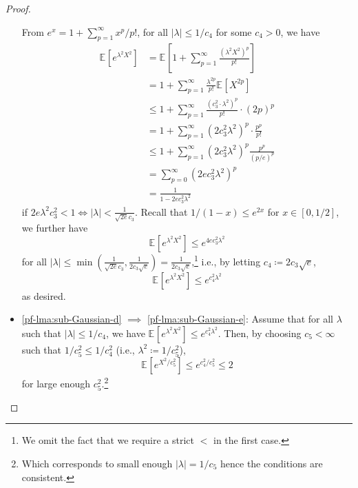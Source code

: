\begin{proof}
\begin{itemize}
		      From \(e^x = 1 + \sum_{p=1}^{\infty } x^p / p! \), for all \(\vert \lambda \vert \leq 1 / c_4\) for some \(c_4 > 0\), we have
		      \begin{align*}
			      \mathbb{E}_{}\left[e^{\lambda ^2 X^2} \right]
			       & = \mathbb{E}_{}\left[1 + \sum_{p=1}^{\infty} \frac{(\lambda ^2 X^2)^p}{p!} \right]                            \\
			       & = 1 + \sum_{p=1}^{\infty} \frac{\lambda ^{2p}}{p!}\mathbb{E}_{}\left[ X^{2p} \right]                          \\
			       & \leq 1 + \sum_{p=1}^{\infty} \frac{(c_3^2 \cdot \lambda ^2 )^p }{p!} \cdot (2p)^{p}                           \\
			       & = 1 + \sum_{p=1}^{\infty} (2 c_3^2 \lambda ^2 )^p \cdot \frac{p^p}{p!}                                        \\
			       & \leq 1 + \sum_{p=1}^{\infty} (2 c_3^2 \lambda ^2 )^p \frac{p^p}{(p / e)^p} \tag*{since \(p! \geq (p / e)^p\)} \\
			       & = \sum_{p=0}^{\infty} (2e c_3^2 \lambda ^2 )^p                                                                \\
			       & = \frac{1}{1 - 2e c_3^2 \lambda ^2 }
		      \end{align*}
		      if \(2e \lambda ^2 c_3^2 < 1 \iff \vert \lambda \vert < \frac{1}{\sqrt{2e} c_3}\). Recall that \(1 / (1 - x) \leq e^{2x}\) for \(x\in [0, 1 / 2]\), we further have
		      \[
			      \mathbb{E}_{}\left[e^{\lambda ^2 X^2} \right] \leq e^{4e c_3^2 \lambda ^2 }
		      \]
		      for all \(\vert \lambda \vert \leq \min ( \frac{1}{\sqrt{2e} c_3} , \frac{1}{2 c_3 \sqrt{e} }) = \frac{1}{2 c_3 \sqrt{e} }\),\footnote{We omit the fact that we require a strict \(<\) in the first case.} i.e., by letting \(c_4 \coloneqq 2 c_3 \sqrt{e} \),
		      \[
			      \mathbb{E}_{}\left[e^{\lambda ^2 X^2} \right] \leq e^{c_4^2 \lambda ^2}
		      \]
		      as desired.
		\item \autoref{pf-lma:sub-Gaussian-d} \(\implies \) \autoref{pf-lma:sub-Gaussian-e}: Assume that for all \(\lambda \) such that \(\vert \lambda  \vert \leq 1 / c_4\), we have \(\mathbb{E}_{}\left[e^{\lambda ^2 X^2} \right] \leq e^{c_4^2 \lambda ^2}\). Then, by choosing \(c_5 < \infty \) such that \(1 / c_5^2 \leq 1 / c_4^2\) (i.e., \(\lambda ^2 \coloneqq 1 / c_5^2\)),
		      \[
			      \mathbb{E}_{}\left[e^{X^2 / c_5^2} \right]
			      \leq e^{c_4^2 / c_5^2} \leq 2
		      \]
		      for large enough \(c_5^2\).\footnote{Which corresponds to small enough \(\vert \lambda \vert = 1 / c_5\) hence the conditions are consistent.}

\end{itemize}
\end{proof}
